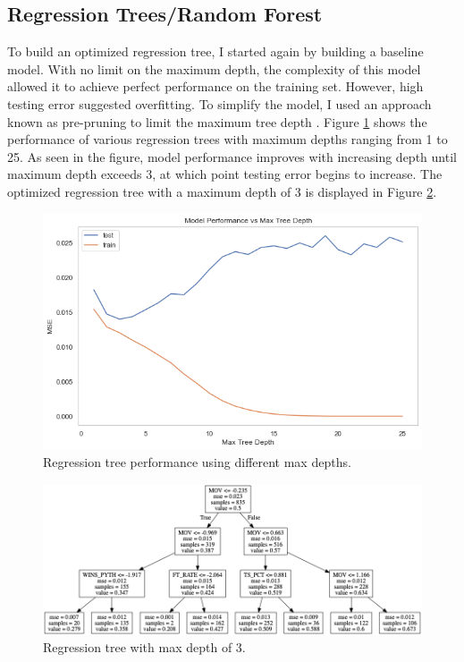 \documentclass[pageno]{jpaper}
\begin{document}
\subsection{Regression Trees/Random Forest}

To build an optimized regression tree, I started again by building a baseline model. With no limit on the maximum depth, the complexity of this model allowed it to achieve perfect performance on the training set. However, high testing error suggested overfitting. To simplify the model, I used an approach known as pre-pruning to limit the maximum tree depth \cite{mitfundamentals}. Figure \ref{fig:treedepth} shows the performance of various regression trees with maximum depths ranging from 1 to 25. As seen in the figure, model performance improves with increasing depth until maximum depth exceeds 3, at which point testing error begins to increase. The optimized regression tree with a maximum depth of 3 is displayed in Figure \ref{fig:bestsingletree}. 

\begin{figure}[hbt]
\centering
\includegraphics[width=0.75\linewidth]{treedepth.png}
\caption{Regression tree performance using different max depths.}
\label{fig:treedepth}
\end{figure}

\begin{figure}[hbt]
\centering
\includegraphics[width=\linewidth]{bestsingletree.png}
\caption{Regression tree with max depth of 3.}
\label{fig:bestsingletree}
\end{figure}
\end{document}
